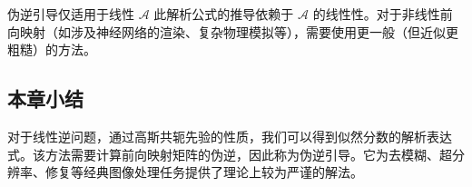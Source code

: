 \begin{warningbox}{伪逆引导仅适用于线性 $\mathcal{A}$}
此解析公式的推导依赖于 $\mathcal{A}$ 的线性性。对于非线性前向映射（如涉及神经网络的渲染、复杂物理模拟等），需要使用更一般（但近似更粗糙）的方法。
\end{warningbox}

\subsection{本章小结}

对于线性逆问题，通过高斯共轭先验的性质，我们可以得到似然分数的解析表达式。该方法需要计算前向映射矩阵的伪逆，因此称为伪逆引导。它为去模糊、超分辨率、修复等经典图像处理任务提供了理论上较为严谨的解法。


